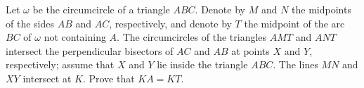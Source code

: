 Let $\omega$ be the circumcircle of a triangle $ABC$. Denote by $M$ and $N$ the midpoints of the sides $AB$ and $AC$,  respectively, and denote by $T$ the midpoint of the arc $BC$ of $\omega$ not containing $A$. The circumcircles of the triangles $AMT$ and $ANT$ intersect the perpendicular bisectors of $AC$ and $AB$ at points $X$ and $Y$,  respectively; assume that $X$ and $Y$ lie inside the triangle $ABC$. The lines $MN$ and $XY$ intersect at $K$. Prove that $KA=KT$.